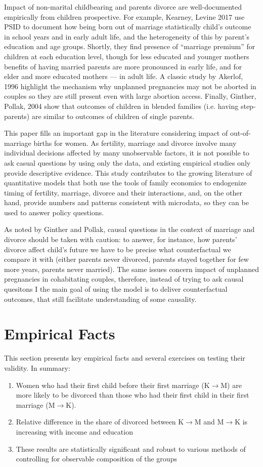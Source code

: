 \documentclass[12pt,letter]{article}
\begin{document}
Impact of non-marital childbearing and parents divorce are well-documented empirically from children prospective. For example, Kearney, Levine 2017 use PSID to document how being born out of marriage statistically child's outcome in school years and in early adult life, and the heterogeneity of this by parent's education and age groups. Shortly, they find presence of ``marriage premium'' for children at each education level, though for less educated and younger mothers benefits of having married parents are more pronounced in early life, and for elder and more educated mothers --- in adult life. A classic study by Akerlof, 1996\nocite{akerlof} highlight the mechanism why unplanned pregnancies may not be aborted in couples so they are still present even with large abortion access. Finally, Ginther, Pollak, 2004 show that outcomes of children in blended families (i.e. having step-parents) are similar to outcomes of children of single parents. 

This paper fills an important gap in the literature considering impact of out-of-marriage births for women. As fertility, marriage and divorce involve many individual decisions affected by many unobservable factors, it is not possible to ask casual questions by using only the data, and existing empirical studies only provide descriptive evidence. This study contributes to the growing literature of quantitative models that both use the tools of family economics to endogenize timing of fertility, marriage, divorce and their interactions, and, on the other hand, provide numbers and patterns consistent with microdata, so they can be used to answer policy questions.

As noted by Ginther and Pollak, causal questions in the context of marriage and divorce should be taken with caution: to answer, for instance, how parents' divorce affect child's future we have to be precise what counterfactual we compare it with (either parents never divorced, parents stayed together for few more years, parents never married). The same issues concern impact of unplanned pregnancies in cohabitating couples, therefore, instead of trying to ask causal quesitons I the main goal of using the model is to deliver counterfactual outcomes, that still facilitate understanding of some causality.

\section{Empirical Facts}

This section presents key empirical facts and several exercises on testing their validity. In summary:
\begin{enumerate}
\item Women who had their first child before their first marriage (K$\to$M) are more likely to be divorced than those who had their first child in their first marriage (M$\to$K).
\item Relative difference in the share of divorced between K$\to$M and M$\to$K is increasing with income and education
\item These results are statistically significant and robust to various methods of controlling for observable composition of the groups
\end{enumerate}
\end{document}
